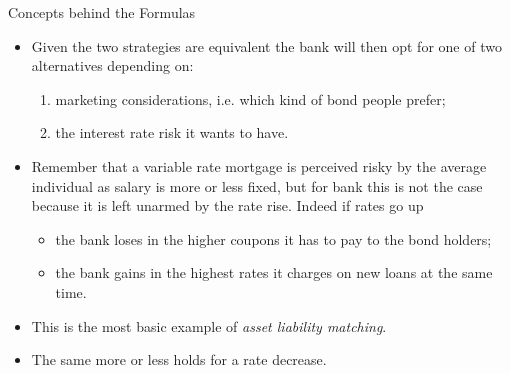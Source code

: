 \documentclass{beamer}
\begin{document}
\begin{frame}{Concepts behind the Formulas}
	\begin{itemize}
		\item<1-> Given the two strategies are equivalent the bank will then opt for one of two alternatives depending on:
		\begin{enumerate}
			\item marketing considerations, i.e. which kind of bond people prefer;
			\item the interest rate risk it wants to have.
		\end{enumerate} 
		\item<2-> Remember that a variable rate mortgage is perceived risky by the average individual as salary is more or less fixed, but for bank this is not the case because it is left unarmed by the rate rise. Indeed if rates go up
		\begin{itemize}
			\item the bank loses in the higher coupons it has to pay to the bond holders;
			\item the bank gains in the highest rates it charges on new loans at the same time.
		\end{itemize}
		\item<3-> This is the most basic example of \emph{asset liability matching}.
		\item<4-> The same more or less holds for a rate decrease.%
	\end{itemize}
\end{frame}
\end{document}
